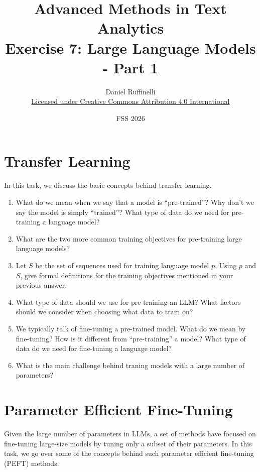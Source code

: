 \documentclass[11pt,a4paper]{article}
\title{Advanced Methods in Text Analytics \\ 
Exercise 7: Large Language Models - Part 1}
\author{Daniel Ruffinelli \\ \href{https://creativecommons.org/licenses/by/4.0/}{Licensed under Creative Commons Attribution 4.0 International}}
\date{FSS 2026}
\begin{document}
\maketitle

\section{Transfer Learning}

In this task, we discuss the basic concepts behind transfer learning.

\begin{enumerate}[label=(\alph*)]
    \item What do we mean when we say that a model is ``pre-trained''?
          Why don't we say the model is simply ``trained''?
          What type of data do we need for pre-training a language model?
    \item What are the two more common training objectives for pre-training
          large language models?
    \item Let $S$ be the set of sequences used for training language model $p$.
          Using $p$ and $S$, give formal definitions for the training objectives
          mentioned in your previous answer.
    \item What type of data should we use for pre-training an LLM? What factors
          should we consider when choosing what data to train on?
    \item We typically talk of fine-tuning a pre-trained model. What do we mean
          by fine-tuning? How is it different from ``pre-training'' a model?
          What type of data do we need for fine-tuning a language model?
    \item What is the main challenge behind traning models with a large number
          of parameters?
\end{enumerate}

\section{Parameter Efficient Fine-Tuning}

Given the large number of parameters in LLMs, a set of methods have focused on
fine-tuning large-size models by tuning only a subset of their parameters.
In this task, we go over some of the concepts behind such parameter efficient
fine-tuning (PEFT) methods.
\end{document}
